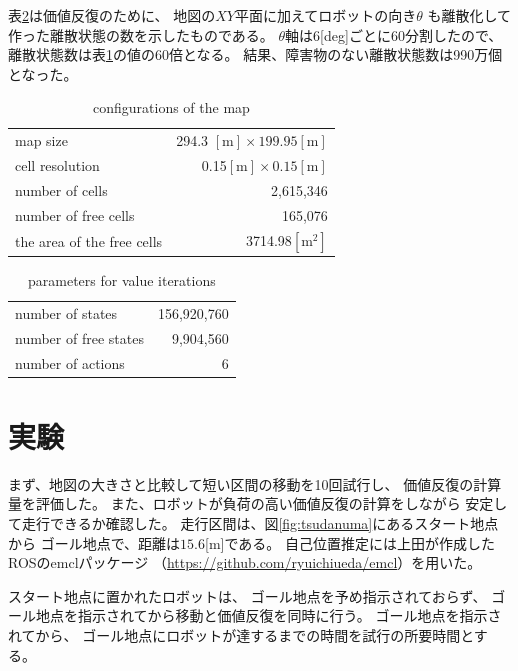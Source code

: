 \documentclass{jarticle}
\begin{document}
表\ref{table:cells}は価値反復のために、
地図の$XY$平面に加えてロボットの向き$\theta$
も離散化して作った離散状態の数を示したものである。
$\theta$軸は6[deg]ごとに60分割したので、
離散状態数は表\ref{table:map}の値の60倍となる。
結果、障害物のない離散状態数は990万個となった。

\begin{table}[bth]
  \caption{conﬁgurations of the map}
	\label{table:map}
  \centering
	\begin{small}
  \begin{tabular}{l|r}
    \hline
    map size & 294.3 $\mathrm{[m]}\times 199.95\mathrm{[m]}$\\
    cell resolution &  0.15$\mathrm{[m]}\times 0.15\mathrm{[m]}$ \\
		number of cells & 2,615,346\\
    number of free cells & 165,076\\
		the area of the free cells & 3714.98$\mathrm{[m^2]}$\\
    \hline
  \end{tabular}
	\end{small}
\end{table}

\begin{table}[bth]
	\caption{parameters for value iterations}
	\label{table:cells}
  \centering
  \begin{tabular}{l|r}
    \hline
    number of states & 156,920,760\\
    number of free states &  9,904,560\\
		number of actions & 6\\
    \hline
  \end{tabular}
\end{table}

\section{実験}%

まず、地図の大きさと比較して短い区間の移動を10回試行し、
価値反復の計算量を評価した。
また、ロボットが負荷の高い価値反復の計算をしながら
安定して走行できるか確認した。
走行区間は、図\ref{fig:tsudanuma}にあるスタート地点から
ゴール地点で、距離は$15.6$[m]である。
自己位置推定には上田が作成したROSのemclパッケージ
（\url{https://github.com/ryuichiueda/emcl}）を用いた。

スタート地点に置かれたロボットは、
ゴール地点を予め指示されておらず、
ゴール地点を指示されてから移動と価値反復を同時に行う。
ゴール地点を指示されてから、
ゴール地点にロボットが達するまでの時間を試行の所要時間とする。
\end{document}

